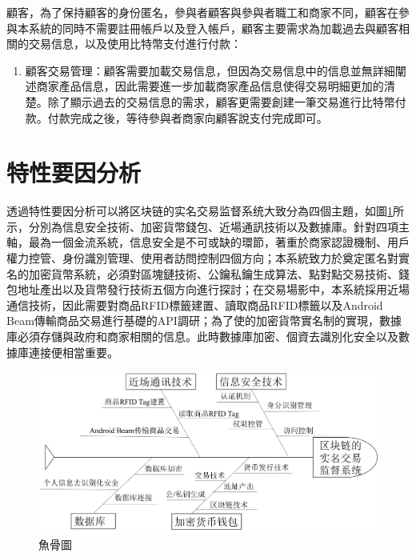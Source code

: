 顧客，為了保持顧客的身份匿名，參與者顧客與參與者職工和商家不同，顧客在參與本系統的同時不需要註冊帳戶以及登入帳戶，顧客主要需求為加載過去與顧客相關的交易信息，以及使用比特幣支付進行付款：
	\begin{enumerate}
	\item 顧客交易管理：顧客需要加載交易信息，但因為交易信息中的信息並無詳細闡述商家產品信息，因此需要進一步加載商家產品信息使得交易明細更加的清楚。除了顯示過去的交易信息的需求，顧客更需要創建一筆交易進行比特幣付款。付款完成之後，等待參與者商家向顧客說支付完成即可。
	\end{enumerate}

	\section{特性要因分析}
	透過特性要因分析可以將区块链的实名交易监督系统大致分為四個主題，如圖\ref{fish1}所示，分別為信息安全技術、加密貨幣錢包、近場通訊技術以及數據庫。針對四項主軸，最為一個金流系統，信息安全是不可或缺的環節，著重於商家認證機制、用戶權力控管、身份識別管理、使用者訪問控制四個方向；本系統致力於奠定匿名對實名的加密貨幣系統，必須對區塊鏈技術、公鑰私鑰生成算法、點對點交易技術、錢包地址產出以及貨幣發行技術五個方向進行探討；在交易場影中，本系統採用近場通信技術，因此需要對商品RFID標籤建置、讀取商品RFID標籤以及Android Beam傳輸商品交易進行基礎的API調研；為了使的加密貨幣實名制的實現，數據庫必須存儲與政府和商家相關的信息。此時數據庫加密、個資去識別化安全以及數據庫連接便相當重要。
		\begin{figure}[!htbp]
			\centering
			\includegraphics[width = 1\textwidth]{fish1.png}
			\caption{魚骨圖}\label{fish1}
		\end{figure}



